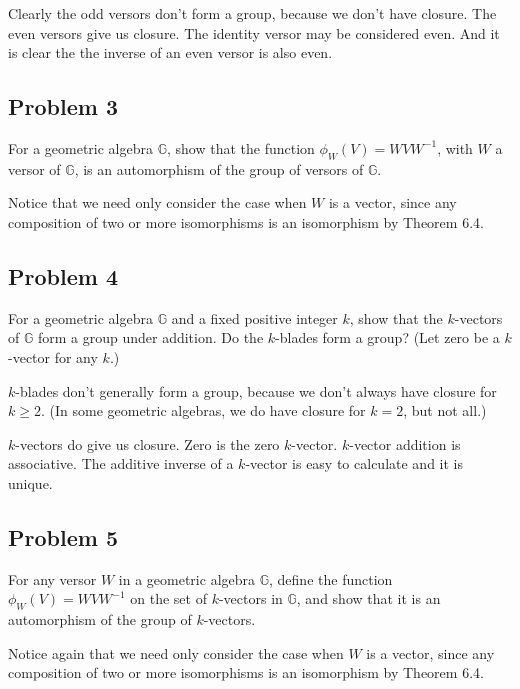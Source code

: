 \documentclass[12pt]{article}
\newcommand{\G}{\mathbb{G}}
\begin{document}
Clearly the odd versors don't form a group, because we don't have closure.
The even versors give us closure.  The identity versor may be considered even.
And it is clear the the inverse of an even versor is also even.

\subsection*{Problem 3}

For a geometric algebra $\G$, show that
the function $\phi_W(V)=WVW^{-1}$, with $W$ a versor of $\G$,
is an automorphism of the group of versors of $\G$.

Notice that we need only consider the case when $W$ is a vector,
since any composition of two or more isomorphisms is an isomorphism by
Theorem 6.4.

\subsection*{Problem 4}

For a geometric algebra $\G$ and a fixed positive integer $k$, show that the $k$-vectors of $\G$
form a group under addition.  Do the $k$-blades form a group?  (Let zero be a $k$-vector for any $k$.)

$k$-blades don't generally form a group, because we don't always have closure for $k\geq 2$.
(In some geometric algebras, we do have closure for $k=2$, but not all.)

$k$-vectors do give us closure.  Zero is the zero $k$-vector.  $k$-vector addition is associative.
The additive inverse of a $k$-vector is easy to calculate and it is unique.

\subsection*{Problem 5}

For any versor $W$ in a geometric algebra $\G$, define
the function $\phi_W(V)=WVW^{-1}$ on the set of $k$-vectors in $\G$,
and show that it is an automorphism of the group of $k$-vectors.

Notice again that we need only consider the case when $W$ is a vector,
since any composition of two or more isomorphisms is an isomorphism by
Theorem 6.4.
\end{document}
